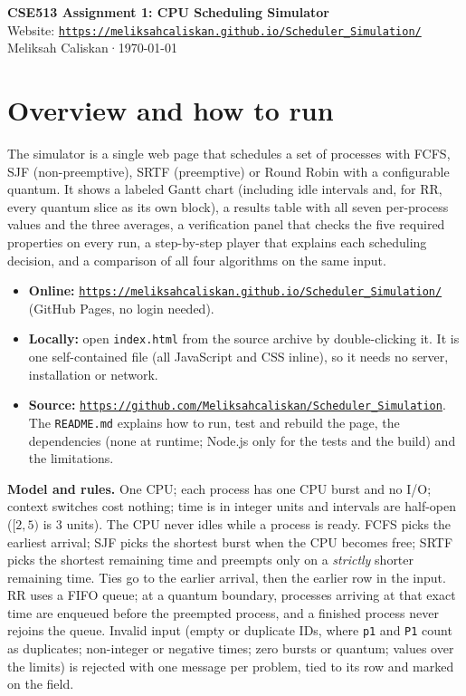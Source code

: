 \documentclass[11pt,a4paper]{article}
\newcommand{\siteurl}{https://meliksahcaliskan.github.io/Scheduler_Simulation/}
\newcommand{\repourl}{https://github.com/Meliksahcaliskan/Scheduler_Simulation}
\newcommand{\authorname}{Meliksah Caliskan}
\begin{document}
\begin{center}
  {\LARGE\bfseries CSE513 Assignment 1: CPU Scheduling Simulator}\\[6pt]
  {\large Website: \textcolor{blue}{\href{\siteurl}{\nolinkurl{\siteurl}}}}\\[6pt]
  \authorname\quad·\quad\today
\end{center}

\section{Overview and how to run}

The simulator is a single web page that schedules a set of processes with FCFS, SJF (non-preemptive),
SRTF (preemptive) or Round Robin with a configurable quantum. It shows a labeled Gantt chart (including idle
intervals and, for RR, every quantum slice as its own block), a results table with all seven per-process values and
the three averages, a verification panel that checks the five required properties on every run, a step-by-step player
that explains each scheduling decision, and a comparison of all four algorithms on the same input.

\begin{itemize}
  \item \textbf{Online:} \href{\siteurl}{\nolinkurl{\siteurl}} (GitHub Pages, no login needed).
  \item \textbf{Locally:} open \texttt{index.html} from the source archive by double-clicking it. It is one
    self-contained file (all JavaScript and CSS inline), so it needs no server, installation or network.
  \item \textbf{Source:} \href{\repourl}{\nolinkurl{\repourl}}. The \texttt{README.md} explains how to run, test and
    rebuild the page, the dependencies (none at runtime; Node.js only for the tests and the build) and the limitations.
\end{itemize}

\textbf{Model and rules.} One CPU; each process has one CPU burst and no I/O; context switches cost nothing; time is in
integer units and intervals are half-open ($[2,5)$ is 3 units). The CPU never idles while a process is ready.
FCFS picks the earliest arrival; SJF picks the shortest burst when the CPU becomes free; SRTF picks the shortest
remaining time and preempts only on a \emph{strictly} shorter remaining time. Ties go to the earlier arrival, then the
earlier row in the input. RR uses a FIFO queue; at a quantum boundary, processes arriving at that exact time are
enqueued before the preempted process, and a finished process never rejoins the queue.
Invalid input (empty or duplicate IDs, where \texttt{p1} and \texttt{P1} count as duplicates; non-integer or negative
times; zero bursts or quantum; values over the limits) is rejected with one message per problem, tied to its row and
marked on the field.
\end{document}
